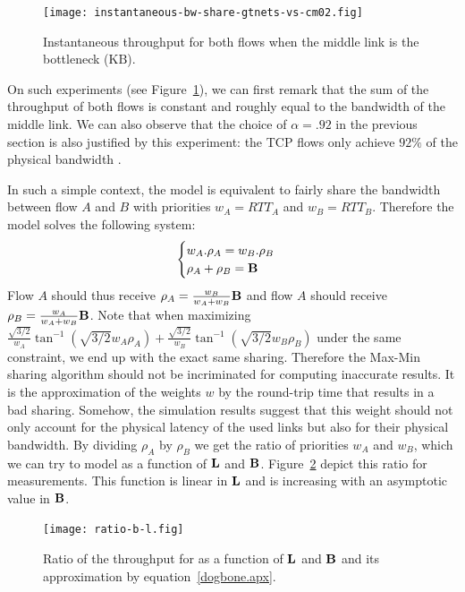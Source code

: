 \documentclass{sig-alternate}
\def\KB{\ensuremath{\text{KB}}\xspace}%
\begin{document}
\begin{figure}
  \centering
  \texttt{[image: instantaneous-bw-share-gtnets-vs-cm02.fig]}
  \caption{Instantaneous throughput for both flows when the middle
    link is the bottleneck (\KB).}
  \label{fig:sum_throughput}
\end{figure}

On such experiments (see Figure~\ref{fig:sum_throughput}), we can
first remark that the sum of the throughput of both flows is constant
and roughly equal to the bandwidth \BDogbone of the middle link. We
can also observe that the choice of $\alpha=.92$ in the previous section
is also justified by this experiment: the TCP flows only achieve
$92\%$ of the physical bandwidth \BDogbone. 

In such a simple context, the \simgrid model is equivalent to fairly
share the bandwidth \BDogbone between flow $A$ and $B$ with priorities
$w_A=RTT_A$ and $w_B=RTT_B$. Therefore the \simgrid model solves the
following system:
\begin{equation*}
  \begin{cases}
    w_A.\rho_A=w_B.\rho_B \\
    \rho_A + \rho_B = \mathbf{B}
  \end{cases}
\end{equation*}
Flow $A$ should thus receive $\rho_A = \frac{w_B}{w_A+w_B}\mathbf{B}$
and flow $A$ should receive $\rho_B =
\frac{w_A}{w_A+w_B}\mathbf{B}$. Note that when maximizing
$\frac{\sqrt{3/2}}{w_A}\tan^{-1}(\sqrt{3/2}w_A\rho_A)+
\frac{\sqrt{3/2}}{w_B}\tan^{-1}(\sqrt{3/2}w_B\rho_B)$ under the same
constraint, we end up with the exact same sharing. Therefore the
Max-Min sharing algorithm should not be incriminated for computing
inaccurate results. It is the approximation of the weights $w$ by the
round-trip time that results in a bad sharing. Somehow, the simulation
results suggest that this weight should not only account for the
physical latency of the used links but also for their physical
bandwidth. By dividing $\rho_A$ by $\rho_B$ we get the ratio of
priorities $w_A$ and $w_B$, which we can try to model as a function of
$\mathbf{L}$ and $\mathbf{B}$. Figure~\ref{fig:gt_ratio_dogbone} depict
this ratio for \gtnets measurements. This function is linear in
$\mathbf{L}$ and is increasing with an asymptotic value in $\mathbf{B}$.

\begin{figure}
  \centering
  \texttt{[image: ratio-b-l.fig]}
  \caption{Ratio of the throughput for \gtnets as a function of $\mathbf{L}$ and $\mathbf{B}$ and its approximation by equation~\eqref{dogbone.apx}.}
  \label{fig:gt_ratio_dogbone}
\end{figure}
\end{document}
